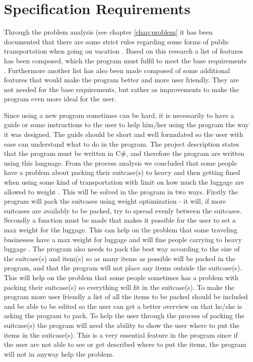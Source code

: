 \section{Specification Requirements}
\label{sec:Spec}
Through the problem analysis (see chapter \ref{chap:problem} it has been documented that there are some strict rules regarding some forms of public transportation when going on vacation . Based on this research a list of features has been composed, which the program must fulfil to meet the base requirements . Furthermore another list has also been made composed of some additional features that would make the program better and more user friendly. They are not needed for the base requirements, but rather as improvements to make the program even more ideal for the user.

Since using a new program sometimes can be hard, it is necessarily to have a guide or some instructions to the user to help him/her using the program the way it was designed. The guide should be short and well formulated so the user with ease can understand what to do in the program. 
The project description states that the program must be written in C\#, and therefore the program are written using this language. 
From the process analysis  we concluded that some people have a problem about packing their suitcase(s) to heavy and then getting fined when using some kind of transportation with limit on how much the luggage are allowed to weight . This will be solved in the program in two ways. Firstly the program will pack the suitcases using weight optimization - it will, if more suitcases are availably to be packed, try to spread evenly between the suitcases. Secondly a function must be made that makes it possible for the user to set a max weight for the luggage. This can help on the problem that some traveling businesses have a max weight for luggage and will fine people carrying to heavy luggage .
The program also needs to pack the best way according to the size of the suitcase(s) and item(s) so as many items as possible will be packed in the program, and that the program will not place any items outside the suitcase(s). This will help on the problem that some people sometimes has a problem with packing their suitcase(s) so everything will fit in the suitcase(s).
To make the program more user friendly a list of all the items to be packed should be included and be able to be edited so the user can get a better overview on that he/she is asking the program to pack.
To help the user through the process of packing the suitcase(s) the program will need the ability to show the user where to put the items in the suitcase(s). This is a very essential feature in the program since if the user are not able to see or get described where to put the items, the program will not in anyway help the problem. 











